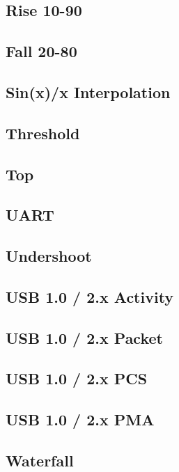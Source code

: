 \documentclass[11pt]{article}
\begin{document}
\subsection{Rise 10-90}
\subsection{Fall 20-80}
\subsection{Sin(x)/x Interpolation}
\subsection{Threshold}
\subsection{Top}
\subsection{UART}
\subsection{Undershoot}
\subsection{USB 1.0 / 2.x Activity}
\subsection{USB 1.0 / 2.x Packet}
\subsection{USB 1.0 / 2.x PCS}
\subsection{USB 1.0 / 2.x PMA}
\subsection{Waterfall}
\end{document}
